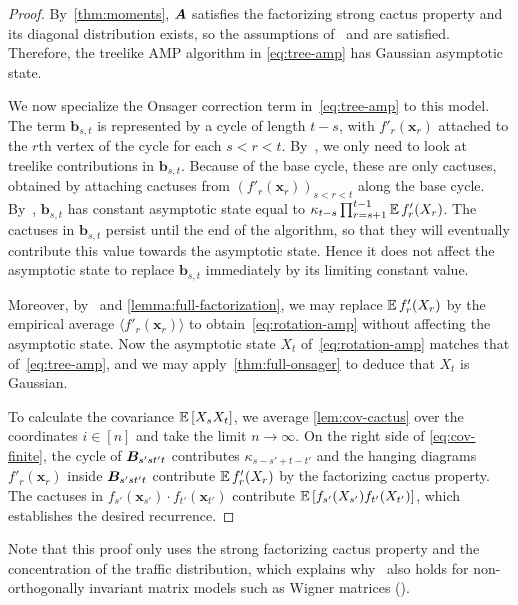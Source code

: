 \begin{proof}
    By~\cref{thm:moments}, ${\bm A}$ satisfies the factorizing strong cactus property and its diagonal distribution exists,
    so the assumptions of~ and  are satisfied.
    Therefore, the treelike AMP algorithm in \cref{eq:tree-amp} has Gaussian asymptotic state.
    
    We now specialize the Onsager correction term in~\cref{eq:tree-amp} to
    this model. The term $\bm b_{s,t}$ is represented by a cycle of length
    $t-s$, with $f'_r(\bm x_r)$ attached to the $r$th vertex of the cycle for each
    $s<r<t$. By~, we
    only need to look at treelike contributions in $\bm b_{s,t}$.
    Because
    of the base cycle, these are only cactuses, obtained by attaching
    cactuses from $(f'_r(\bm x_r))_{s<r<t}$
    along the base cycle. 
    By~,
    $\bm b_{s,t}$ has constant asymptotic
    state equal to
    $\kappa_{t-s}\prod_{r=s+1}^{t-1}\operatorname*{\mathbb{E}} f'_r(X_r)$.
    The cactuses in $\bm b_{s,t}$ persist until the end of the algorithm,
    so that they will eventually contribute this value towards the asymptotic state.
    Hence it does not affect the asymptotic state to replace $\bm b_{s,t}$ immediately by its limiting constant value.
    
    Moreover, by~ and \cref{lemma:full-factorization}, we may replace $\operatorname*{\mathbb{E}} f'_r(X_r)$ by the empirical average
    $\langle f'_r (\bm x_r)\rangle$ to obtain~\cref{eq:rotation-amp} without affecting the asymptotic state.
    Now the asymptotic state $X_t$ of~\cref{eq:rotation-amp} matches that of~\cref{eq:tree-amp}, and we may apply~\cref{thm:full-onsager} to deduce that $X_t$ is Gaussian.

    To calculate the covariance $\operatorname*{\mathbb{E}}\left[X_sX_t\right]$, we average \cref{lem:cov-cactus} over the coordinates $i \in [n]$ and take the limit $n \to \infty$.
    On the right side of \cref{eq:cov-finite},
    the cycle of ${\bm B}_{s'st't}$ contributes $\kappa_{s-s'+t-t'}$ and the hanging diagrams $f'_r(\bm x_r)$ inside ${\bm B}_{s'st't}$ contribute
    $\operatorname*{\mathbb{E}} f'_r(X_r)$ by the factorizing cactus property.
    The cactuses in $f_{s'}(\bm x_{s'}) \cdot f_{t'}(\bm x_{t'})$ contribute $\operatorname*{\mathbb{E}}\left[f_{s'}(X_{s'})f_{t'}(X_{t'})\right]$, which establishes the desired recurrence.
\end{proof}

\noindent Note that this proof only
uses the strong factorizing cactus
property and the concentration of the
traffic distribution, which explains
why~ also holds
for non-orthogonally invariant matrix
models such as Wigner matrices ().

